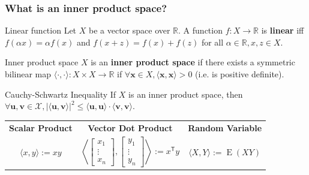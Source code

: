 \documentclass{beamer}
\begin{document}
    \begin{frame}
        \frametitle{What is an inner product space?}

        \begin{block}{Linear function}
            Let $X$ be a vector space over $\mathbb R$. A function $f: X \rightarrow \mathbb R$ is \textbf{linear} iff $f(\alpha x)= \alpha f(x)$
            and $f(x+z)=f(x)+f(z)$ for all $\alpha\in\mathbb R, x,z \in X$.
        \end{block}

        \begin{block}{Inner product space}
            $X$ is an \textbf{inner product space} if there exists a symmetric bilinear map $\langle \cdot ,\cdot \rangle :X\times X\to \mathbb R$ if $\forall \mathbf x \in X, \langle \mathbf x,\mathbf x \rangle > 0$ (i.e. is positive definite).
        \end{block}
        \begin{block}{Cauchy-Schwartz Inequality}
            If $X$ is an inner product space, then $\forall \mathbf u, \mathbf v \in \mathcal X, |\langle\mathbf u, \mathbf v\rangle|^2 \leq \langle \mathbf u, \mathbf u\rangle\cdot\langle\mathbf v, \mathbf v\rangle$.
        \end{block}
        \begin{center}
            \begin{tabular}{ c c c }
                \textbf{Scalar Product} & \textbf{Vector Dot Product} & \textbf{Random Variable} \\
                $\langle x,y\rangle := xy$ &
                $\left\langle {\begin{bmatrix}
                                   x_{1}\\\vdots \\x_{n}
                \end{bmatrix}},{\begin{bmatrix}
                                    y_{1}\\\vdots \\y_{n}
                \end{bmatrix}}\right\rangle :=x^{\textsf {T}}y$ &
                $\langle X,Y\rangle :=\operatorname {E} (XY)$
            \end{tabular}
        \end{center}
    \end{frame}
\end{document}
